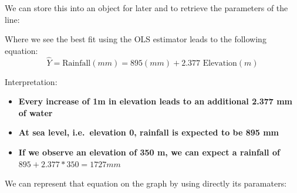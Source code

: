 \documentclass[
  letterpaper,
  DIV=11,
  numbers=noendperiod]{scrreprt}
\newenvironment{Shaded}{\begin{snugshade}}{\end{snugshade}}
\newcommand{\AttributeTok}[1]{\textcolor[rgb]{0.40,0.45,0.13}{#1}}
\newcommand{\CommentTok}[1]{\textcolor[rgb]{0.37,0.37,0.37}{#1}}
\newcommand{\DecValTok}[1]{\textcolor[rgb]{0.68,0.00,0.00}{#1}}
\newcommand{\FunctionTok}[1]{\textcolor[rgb]{0.28,0.35,0.67}{#1}}
\newcommand{\NormalTok}[1]{\textcolor[rgb]{0.00,0.23,0.31}{#1}}
\newcommand{\OtherTok}[1]{\textcolor[rgb]{0.00,0.23,0.31}{#1}}
\newcommand{\SpecialCharTok}[1]{\textcolor[rgb]{0.37,0.37,0.37}{#1}}
\newcommand{\StringTok}[1]{\textcolor[rgb]{0.13,0.47,0.30}{#1}}
\begin{document}
We can store this into an object for later and to retrieve the
parameters of the line:

\begin{Shaded}
\end{Shaded}

Where we see the best fit using the OLS estimator leads to the following
equation:
\[\hat{Y}= \text{Rainfall}  (mm) = 895 (mm) + 2.377 \text{ Elevation} (m)\]

Interpretation:

\begin{itemize}
\item
  \textbf{Every increase of 1m in elevation leads to an additional 2.377
  mm of water}
\item
  \textbf{At sea level, i.e.~elevation 0, rainfall is expected to be 895
  mm}
\item
  \textbf{If we observe an elevation of 350 m, we can expect a rainfall
  of} \(895 + 2.377 * 350= 1727 mm\)
\end{itemize}

We can represent that equation on the graph by using directly its
paramaters:

\begin{Shaded}
\end{Shaded}
\end{document}
